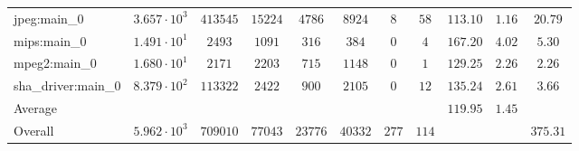 \begin{tabular}{|l|c|c|c|c|c|c|c|c|c|c|}
jpeg:main\_0            & $ 3.657 \cdot 10^{3}  $ & $ 413545 $ & $ 15224 $ & $ 4786  $ & $ 8924  $ & $ 8   $ & $ 58  $ & $ 113.10      $ & $ 1.16    $ & $ 20.79   $ \\
mips:main\_0            & $ 1.491 \cdot 10^{1}  $ & $ 2493   $ & $ 1091  $ & $ 316   $ & $ 384   $ & $ 0   $ & $ 4   $ & $ 167.20      $ & $ 4.02    $ & $ 5.30    $ \\
mpeg2:main\_0           & $ 1.680 \cdot 10^{1}  $ & $ 2171   $ & $ 2203  $ & $ 715   $ & $ 1148  $ & $ 0   $ & $ 1   $ & $ 129.25      $ & $ 2.26    $ & $ 2.26    $ \\
sha\_driver:main\_0     & $ 8.379 \cdot 10^{2}  $ & $ 113322 $ & $ 2422  $ & $ 900   $ & $ 2105  $ & $ 0   $ & $ 12  $ & $ 135.24      $ & $ 2.61    $ & $ 3.66    $ \\
\hline
Average                 & $                     $ & $        $ & $       $ & $       $ & $       $ & $     $ & $     $ & $ 119.95      $ & $ 1.45    $ & $         $ \\
\hline
Overall                 & $ 5.962 \cdot 10^{3}  $ & $ 709010 $ & $ 77043 $ & $ 23776 $ & $ 40332 $ & $ 277 $ & $ 114 $ & $             $ & $         $ & $ 375.31  $ \\
\hline
\end{tabular}
